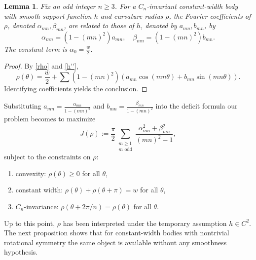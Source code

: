 \documentclass[11pt,letterpaper,reqno]{amsart}
\newtheorem{lemma}[theorem]{Lemma}
\begin{document}
\begin{lemma}
    Fix an odd integer $n\ge3$. For a $C_n$-invariant constant-width body with smooth support function $h$ and curvature radius $\rho$, the Fourier coefficients of $\rho$, denoted $\alpha_{mn}, \beta_{mn}$, are related to those of $h$, denoted by $a_{mn}, b_{mn}$, by 
\[
\alpha_{mn} = (1-(mn)^2)a_{mn}, \quad \beta_{mn} = (1-(mn)^2)b_{mn}.
\]
The constant term is $\alpha_0 = \frac{w}{2}$.
\end{lemma}

\begin{proof}
By \eqref{rho} and \eqref{h''},
\[
\rho(\theta) = \frac{w}{2} + \sum (1-(mn)^2)(a_{mn}\cos (mn\theta) + b_{mn} \sin (mn\theta)).
\]
Identifying coefficients yields the conclusion.
\end{proof}


Substituting $a_{mn} = \frac{\alpha_{mn}}{1-(mn)^2}$ and  $b_{mn} = \frac{\beta_{mn}}{1-(mn)^2}$ into the deficit formula our problem becomes to maximize
\begin{equation} \label{J}
    J(\rho) := \frac{\pi}{2} \sum_{\substack{m \ge 1\\m\text{ odd}}} \frac{\alpha_{mn}^2+\beta_{mn}^2}{(mn)^2-1},
\end{equation}
subject to the constraints on $\rho$:
\begin{enumerate}
\item convexity: $\rho(\theta) \ge 0$ for all $\theta$,
\item constant width: $\rho(\theta) + \rho(\theta+\pi) = w$ for all $\theta$,
\item $C_n$-invariance: $\rho(\theta + 2\pi/n) = \rho(\theta)$ for all $\theta$.
\end{enumerate}


Up to this point, $\rho$ has been interpreted under the temporary assumption $h\in C^2$. The next proposition shows that for constant-width bodies with nontrivial rotational symmetry the same object is available without any smoothness hypothesis. 

\end{document}

